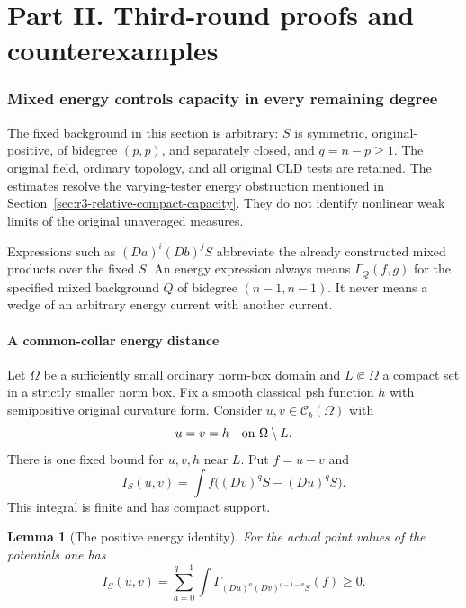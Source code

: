 \documentclass[11pt,a4paper]{article}
\numberwithin{equation}{section}
\newtheorem{lemma}[theorem]{Lemma}
\theoremstyle{definition}
\theoremstyle{remark}
\newcommand{\Cb}{\mathcal C_b}
\begin{document}
\clearpage
\part*{Part II. Third-round proofs and counterexamples}

\section{Mixed energy controls capacity in every remaining degree}
\label{sec:r3-all-degree-energy}

The fixed background in this section is arbitrary: $S$ is symmetric,
original-positive, of bidegree $(p,p)$, and separately closed, and
$q=n-p\geq1$. The original field, ordinary topology, and all original
CLD tests are retained. The estimates resolve the varying-tester
energy obstruction mentioned in
Section~\ref{sec:r3-relative-compact-capacity}. They do not identify
nonlinear weak limits of the original unaveraged measures.

Expressions such as $(Da)^i(Db)^jS$ abbreviate the already constructed
mixed products over the fixed $S$. An energy expression always means
$\Gamma_Q(f,g)$ for the specified mixed background $Q$ of bidegree
$(n-1,n-1)$. It never means a wedge of an arbitrary energy current
with another current.

\subsection{A common-collar energy distance}

Let $\Omega$ be a sufficiently small ordinary norm-box domain and
$L\Subset\Omega$ a compact set in a strictly smaller norm box. Fix
a smooth classical psh function $h$ with semipositive original
curvature form. Consider $u,v\in\Cb(\Omega)$ with
\[
 u=v=h\quad\hbox{on }\Omega\setminus L.
\]
There is one fixed bound for $u,v,h$ near $L$. Put $f=u-v$ and
\begin{equation}
 \label{eq:r3-I-energy}
 I_S(u,v)=\int f\bigl((Dv)^qS-(Du)^qS\bigr).
\end{equation}
This integral is finite and has compact support.

\begin{lemma}[The positive energy identity]
\label{lem:r3-I-positive}
For the actual point values of the potentials one has
\[
 I_S(u,v)=\sum_{a=0}^{q-1}
    \int\Gamma_{(Du)^a(Dv)^{q-1-a}S}(f)\geq0.
\]
\end{lemma}
\end{document}
